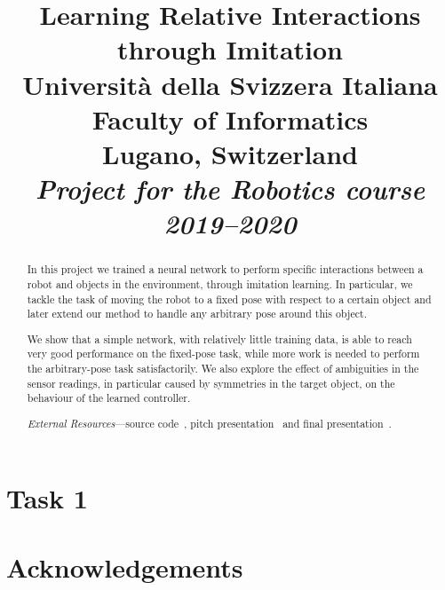 \documentclass[conference]{IEEEtran}
\begin{document}
\title{Learning Relative Interactions through Imitation \\ \vspace{0.5\baselineskip}
{
	\large {Università della Svizzera Italiana}\\
	{Faculty of Informatics} \\
	Lugano, Switzerland \\
	\textit{Project for the Robotics course 2019--2020}\\
}
}

\author{
\and
{}
}

\maketitle
\thispagestyle{plain}
\pagestyle{plain}

\begin{abstract}
In this project we trained a neural network to perform specific interactions 
between a robot and objects in the environment, through imitation learning. In 
particular, we tackle the task of moving the robot to a fixed pose with respect 
to a certain object and later extend our method to handle any arbitrary pose 
around this object.

We show that a simple network, with relatively little training data, is able to 
reach very good performance on the fixed-pose task, while more work is needed 
to perform the arbitrary-pose task satisfactorily. We also explore the effect 
of ambiguities in the sensor readings, in particular caused by symmetries in 
the target object, on the behaviour of the learned controller.

\emph{External Resources}---source code~\cite{github}, pitch 
presentation~\cite{pitch} and final presentation~\cite{final-pitch}.

\end{abstract}





\section{Task 1}
\label{sec:task1}







\section*{Acknowledgements}




\end{document}
